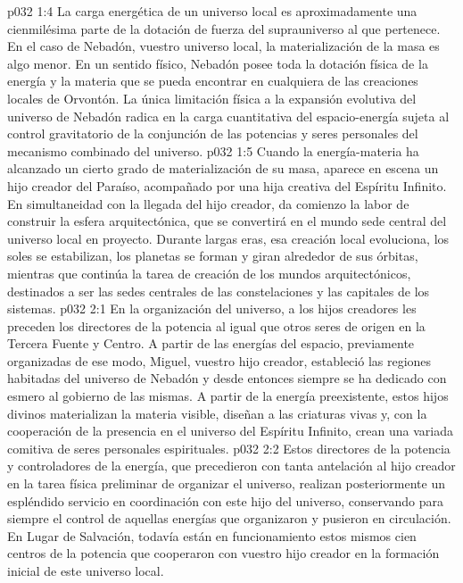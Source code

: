 \vs p032 1:4 La carga energética de un universo local es aproximadamente una cienmilésima parte de la dotación de fuerza del suprauniverso al que pertenece. En el caso de Nebadón, vuestro universo local, la materialización de la masa es algo menor. En un sentido físico, Nebadón posee toda la dotación física de la energía y la materia que se pueda encontrar en cualquiera de las creaciones locales de Orvontón. La única limitación física a la expansión evolutiva del universo de Nebadón radica en la carga cuantitativa del espacio\hyp{}energía sujeta al control gravitatorio de la conjunción de las potencias y seres personales del mecanismo combinado del universo.
\vs p032 1:5 \pc Cuando la energía\hyp{}materia ha alcanzado un cierto grado de materialización de su masa, aparece en escena un hijo creador del Paraíso, acompañado por una hija creativa del Espíritu Infinito. En simultaneidad con la llegada del hijo creador, da comienzo la labor de construir la esfera arquitectónica, que se convertirá en el mundo sede central del universo local en proyecto. Durante largas eras, esa creación local evoluciona, los soles se estabilizan, los planetas se forman y giran alrededor de sus órbitas, mientras que continúa la tarea de creación de los mundos arquitectónicos, destinados a ser las sedes centrales de las constelaciones y las capitales de los sistemas.
\vs p032 2:1 En la organización del universo, a los hijos creadores les preceden los directores de la potencia al igual que otros seres de origen en la Tercera Fuente y Centro. A partir de las energías del espacio, previamente organizadas de ese modo, Miguel, vuestro hijo creador, estableció las regiones habitadas del universo de Nebadón y desde entonces siempre se ha dedicado con esmero al gobierno de las mismas. A partir de la energía preexistente, estos hijos divinos materializan la materia visible, diseñan a las criaturas vivas y, con la cooperación de la presencia en el universo del Espíritu Infinito, crean una variada comitiva de seres personales espirituales.
\vs p032 2:2 Estos directores de la potencia y controladores de la energía, que precedieron con tanta antelación al hijo creador en la tarea física preliminar de organizar el universo, realizan posteriormente un espléndido servicio en coordinación con este hijo del universo, conservando para siempre el control de aquellas energías que organizaron y pusieron en circulación. En Lugar de Salvación, todavía están en funcionamiento estos mismos cien centros de la potencia que cooperaron con vuestro hijo creador en la formación inicial de este universo local.
